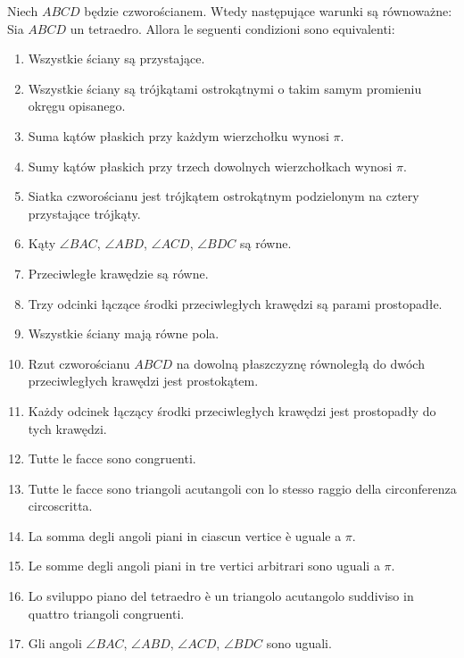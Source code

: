 \begin{proposition}
    Niech $ABCD$ będzie czworościanem. %
    Wtedy następujące warunki są równoważne: %
    Sia $ABCD$ un tetraedro. %
    Allora le seguenti condizioni sono equivalenti: %
    \begin{enumerate}
        \item Wszystkie ściany są przystające. %
        \item Wszystkie ściany są trójkątami ostrokątnymi o takim samym promieniu okręgu opisanego. %
        \item Suma kątów płaskich przy każdym wierzchołku wynosi $\pi$. %
        \item Sumy kątów płaskich przy trzech dowolnych wierzchołkach wynosi $\pi$. %
        \item Siatka czworościanu jest trójkątem ostrokątnym podzielonym na cztery przystające trójkąty. %
        \item Kąty $\angle BAC$, $\angle ABD$, $\angle ACD$, $\angle BDC$ są równe. %
        \item Przeciwległe krawędzie są równe. %
        \item Trzy odcinki łączące środki przeciwległych krawędzi są parami prostopadłe. %
        \item Wszystkie ściany mają równe pola. %
        \item Rzut czworościanu $ABCD$ na dowolną płaszczyznę równoległą do dwóch przeciwległych krawędzi jest prostokątem. %
        \item Każdy odcinek łączący środki przeciwległych krawędzi jest prostopadły do tych krawędzi. %
        \item Tutte le facce sono congruenti. %
        \item Tutte le facce sono triangoli acutangoli con lo stesso raggio della circonferenza circoscritta. %
        \item La somma degli angoli piani in ciascun vertice è uguale a $\pi$. %
        \item Le somme degli angoli piani in tre vertici arbitrari sono uguali a $\pi$. %
        \item Lo sviluppo piano del tetraedro è un triangolo acutangolo suddiviso in quattro triangoli congruenti. %
        \item Gli angoli $\angle BAC$, $\angle ABD$, $\angle ACD$, $\angle BDC$ sono uguali. %

\end{enumerate}
\end{proposition}
